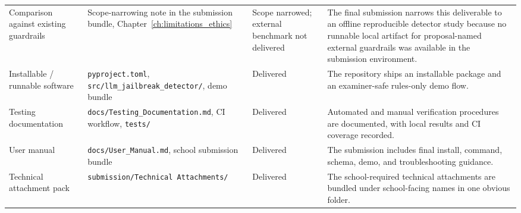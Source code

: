 \begin{longtable}{p{}p{}p{}p{}}
Comparison against existing guardrails & Scope-narrowing note in the submission bundle, Chapter~\ref{ch:limitations_ethics} & Scope narrowed; external benchmark not delivered & The final submission narrows this deliverable to an offline reproducible detector study because no runnable local artifact for proposal-named external guardrails was available in the submission environment. \\
Installable / runnable software & \texttt{pyproject.toml}, \texttt{src/llm\_jailbreak\_detector/}, demo bundle & Delivered & The repository ships an installable package and an examiner-safe rules-only demo flow. \\
Testing documentation & \texttt{docs/Testing\_Documentation.md}, CI workflow, \texttt{tests/} & Delivered & Automated and manual verification procedures are documented, with local results and CI coverage recorded. \\
User manual & \texttt{docs/User\_Manual.md}, school submission bundle & Delivered & The submission includes final install, command, schema, demo, and troubleshooting guidance. \\
Technical attachment pack & \texttt{submission/Technical Attachments/} & Delivered & The school-required technical attachments are bundled under school-facing names in one obvious folder. \\
\end{longtable}
\normalsize
